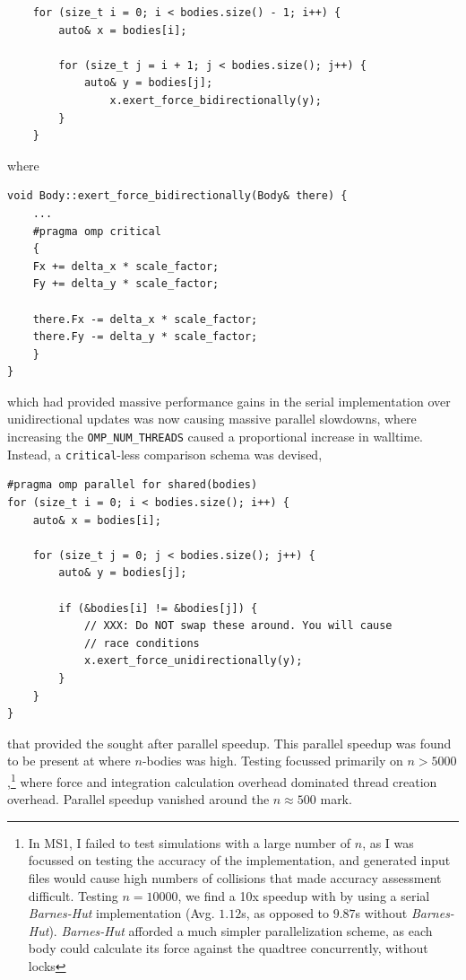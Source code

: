 \documentclass[11pt,a4paper]{article}
\begin{document}
\begin{verbatim}
    for (size_t i = 0; i < bodies.size() - 1; i++) {
        auto& x = bodies[i];
        
        for (size_t j = i + 1; j < bodies.size(); j++) {
            auto& y = bodies[j];
                x.exert_force_bidirectionally(y);
        }
    }
\end{verbatim}

where 

\begin{verbatim}
void Body::exert_force_bidirectionally(Body& there) {
    ...
    #pragma omp critical
    {
    Fx += delta_x * scale_factor;
    Fy += delta_y * scale_factor;

    there.Fx -= delta_x * scale_factor;
    there.Fy -= delta_y * scale_factor;
    }
}
\end{verbatim}

which had provided massive performance gains in the serial implementation over unidirectional updates was now causing massive parallel slowdowns, where increasing the \texttt{OMP\_NUM\_THREADS} caused a proportional increase in walltime. Instead, a \texttt{critical}-less comparison schema was devised, 

\begin{verbatim}
#pragma omp parallel for shared(bodies)
for (size_t i = 0; i < bodies.size(); i++) {
    auto& x = bodies[i];

    for (size_t j = 0; j < bodies.size(); j++) {
        auto& y = bodies[j];

        if (&bodies[i] != &bodies[j]) {
            // XXX: Do NOT swap these around. You will cause
            // race conditions
            x.exert_force_unidirectionally(y);
        }
    }
}
\end{verbatim}

that provided the sought after parallel speedup. This parallel speedup was found to be present at where $n$-bodies was high. Testing focussed primarily on $n > 5000$,\footnote{In MS1, I failed to test simulations with a large number of $n$, as I was focussed on testing the accuracy of the implementation, and generated input files would cause high numbers of collisions that made accuracy assessment difficult. Testing $n=10000$, we find a 10x speedup with by using a serial \textit{Barnes-Hut} implementation (Avg. $1.12$s, as opposed to $9.87$s without \textit{Barnes-Hut}). \textit{Barnes-Hut} afforded a much simpler parallelization scheme, as each body could calculate its force against the quadtree concurrently, without locks} where force and integration calculation overhead dominated thread creation overhead. Parallel speedup vanished around the $n \approx 500$ mark.
\end{document}
